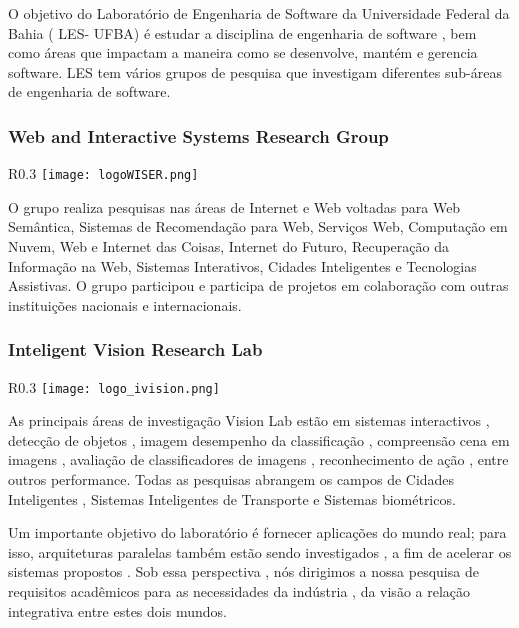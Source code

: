 O objetivo do Laboratório de Engenharia de Software da Universidade Federal da Bahia ( LES- UFBA) é estudar a disciplina de engenharia de software , bem como áreas que impactam a maneira como se desenvolve, mantém e gerencia software. LES tem vários grupos de pesquisa que investigam diferentes sub-áreas de engenharia de software.


\subsubsection{Web and Interactive Systems Research Group}
\begin{wrapfigure}{R}{0.3\textwidth}
            \centering
            \texttt{[image: logoWISER.png]}
        \end{wrapfigure}
O grupo realiza pesquisas nas áreas de Internet e Web voltadas para Web Semântica, Sistemas de Recomendação para Web, Serviços Web, Computação em Nuvem, Web e Internet das Coisas, Internet do Futuro, Recuperação da Informação na Web, Sistemas Interativos, Cidades Inteligentes e Tecnologias Assistivas. O grupo participou e participa de projetos em colaboração com outras instituições nacionais e internacionais.

\subsubsection{Inteligent Vision Research Lab}
\begin{wrapfigure}{R}{0.3\textwidth}
            \centering
            \texttt{[image: logo\_ivision.png]}
        \end{wrapfigure}
As principais áreas de investigação Vision Lab estão em sistemas interactivos , detecção de objetos , imagem desempenho da classificação , compreensão cena em imagens , avaliação de classificadores de imagens , reconhecimento de ação , entre outros performance. Todas as pesquisas abrangem os campos de Cidades Inteligentes , Sistemas Inteligentes de Transporte e Sistemas biométricos.
	  
	  Um importante objetivo do laboratório é fornecer aplicações do mundo real; para isso, arquiteturas paralelas também estão sendo investigados , a fim de acelerar os sistemas propostos . Sob essa perspectiva , nós dirigimos a nossa pesquisa de requisitos acadêmicos para as necessidades da indústria , da visão a relação integrativa entre estes dois mundos.


